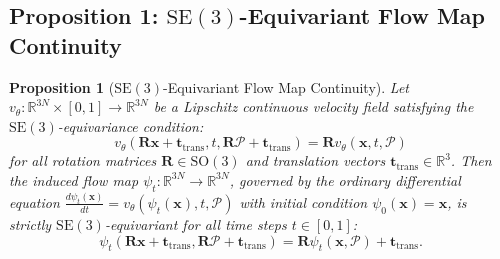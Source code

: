 \documentclass[11pt,a4paper]{article}
\newtheorem{proposition}{Proposition}
\begin{document}
\subsection*{Proposition 1: $\mathrm{SE}(3)$-Equivariant Flow Map Continuity}
\begin{proposition}[$\mathrm{SE}(3)$-Equivariant Flow Map Continuity]
Let $v_\theta: \mathbb{R}^{3N} \times [0, 1] \to \mathbb{R}^{3N}$ be a Lipschitz continuous velocity field satisfying the $\mathrm{SE}(3)$-equivariance condition:
\begin{equation}
v_\theta(\mathbf{R}\mathbf{x} + \mathbf{t}_{\text{trans}}, t, \mathbf{R}\mathcal{P} + \mathbf{t}_{\text{trans}}) = \mathbf{R} v_\theta(\mathbf{x}, t, \mathcal{P})
\end{equation}
for all rotation matrices $\mathbf{R} \in \mathrm{SO}(3)$ and translation vectors $\mathbf{t}_{\text{trans}} \in \mathbb{R}^3$. Then the induced flow map $\psi_t: \mathbb{R}^{3N} \to \mathbb{R}^{3N}$, governed by the ordinary differential equation $\frac{d\psi_t(\mathbf{x})}{dt} = v_\theta(\psi_t(\mathbf{x}), t, \mathcal{P})$ with initial condition $\psi_0(\mathbf{x}) = \mathbf{x}$, is strictly $\mathrm{SE}(3)$-equivariant for all time steps $t \in [0, 1]$:
\begin{equation}
\psi_t(\mathbf{R}\mathbf{x} + \mathbf{t}_{\text{trans}}, \mathbf{R}\mathcal{P} + \mathbf{t}_{\text{trans}}) = \mathbf{R} \psi_t(\mathbf{x}, \mathcal{P}) + \mathbf{t}_{\text{trans}}.
\end{equation}
\end{proposition}
\end{document}
